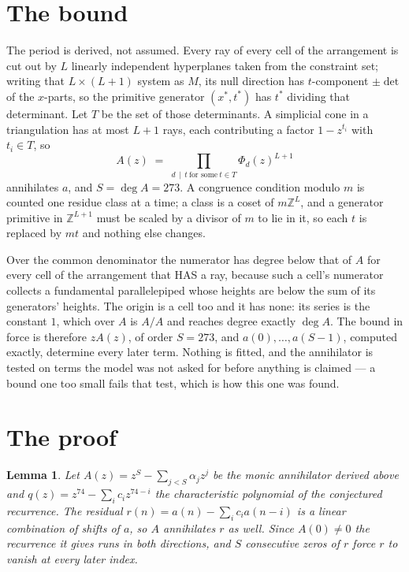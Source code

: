 \documentclass[11pt,a4paper]{article}
\theoremstyle{plain}
\newtheorem{lemma}[theorem]{Lemma}
\theoremstyle{definition}
\begin{document}
\section{The bound}

The period is derived, not assumed. Every ray of every cell of the arrangement is cut out by
$L$ linearly independent hyperplanes taken from the constraint set; writing that $L\times(L+1)$
system as $M$, its null direction has $t$-component $\pm\det$ of the $x$-parts, so the
primitive generator $(x^*,t^*)$ has $t^*$ dividing that determinant. Let $T$ be the set of
those determinants. A simplicial cone in a triangulation has at most $L+1$ rays, each
contributing a factor $1-z^{t_i}$ with $t_i\in T$, so
\[
A(z)\;=\;\prod_{d\,\mid\,t\ \text{for some}\ t\in T}\Phi_d(z)^{L+1}
\]
annihilates $a$, and $S=\deg A=273$. A congruence condition modulo $m$ is counted one residue
class at a time; a class is a coset of $m\mathbb{Z}^L$, and a generator primitive in
$\mathbb{Z}^{L+1}$ must be scaled by a divisor of $m$ to lie in it, so each $t$ is replaced
by $mt$ and nothing else changes.

Over the common denominator the numerator has degree below that of $A$ for every cell of the
arrangement that HAS a ray, because such a cell's numerator collects a fundamental
parallelepiped whose heights are below the sum of its generators' heights. The origin is a cell
too and it has none: its series is the constant $1$, which over $A$ is $A/A$ and reaches degree
exactly $\deg A$. The bound in force is therefore $zA(z)$, of order $S=273$, and
$a(0),\dots,a(S-1)$, computed exactly, determine every later term. Nothing is fitted, and the
annihilator is tested on terms the model was not asked for before anything is claimed --- a
bound one too small fails that test, which is how this one was found.

\section{The proof}

\begin{lemma}\label{lem:crit}
Let $A(z)=z^S-\sum_{j<S}\alpha_jz^{j}$ be the monic annihilator derived above and
$q(z)=z^{74}-\sum_ic_iz^{74-i}$ the characteristic polynomial of the conjectured
recurrence. The residual $r(n)=a(n)-\sum_ic_ia(n-i)$ is a linear combination of shifts of $a$,
so $A$ annihilates $r$ as well. Since $A(0)\ne0$ the recurrence it gives runs in both
directions, and $S$ consecutive zeros of $r$ force $r$ to vanish at every later index.
\end{lemma}
\end{document}
